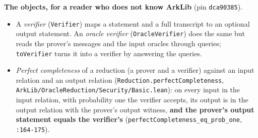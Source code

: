 \textbf{The objects, for a reader who does not know ArkLib} (pin \texttt{dca90385}).

\begin{itemize}
\item A \emph{verifier} (\texttt{Verifier}) maps a statement and a full transcript to an optional output statement. An \emph{oracle verifier} (\texttt{OracleVerifier}) does the same but reads the prover's messages and the input oracles through queries; \texttt{toVerifier} turns it into a verifier by answering the queries.
\item \emph{Perfect completeness} of a reduction (a prover and a verifier) against an input relation and an output relation (\texttt{R\allowbreak{}e\allowbreak{}d\allowbreak{}u\allowbreak{}c\allowbreak{}t\allowbreak{}i\allowbreak{}o\allowbreak{}n\allowbreak{}.\allowbreak{}p\allowbreak{}e\allowbreak{}r\allowbreak{}f\allowbreak{}e\allowbreak{}c\allowbreak{}t\allowbreak{}C\allowbreak{}o\allowbreak{}m\allowbreak{}p\allowbreak{}l\allowbreak{}e\allowbreak{}t\allowbreak{}e\allowbreak{}n\allowbreak{}e\allowbreak{}s\allowbreak{}s}, \texttt{A\allowbreak{}r\allowbreak{}k\allowbreak{}L\allowbreak{}i\allowbreak{}b\allowbreak{}/\allowbreak{}O\allowbreak{}r\allowbreak{}a\allowbreak{}c\allowbreak{}l\allowbreak{}e\allowbreak{}R\allowbreak{}e\allowbreak{}d\allowbreak{}u\allowbreak{}c\allowbreak{}t\allowbreak{}i\allowbreak{}o\allowbreak{}n\allowbreak{}/\allowbreak{}S\allowbreak{}e\allowbreak{}c\allowbreak{}u\allowbreak{}r\allowbreak{}i\allowbreak{}t\allowbreak{}y\allowbreak{}/\allowbreak{}B\allowbreak{}a\allowbreak{}s\allowbreak{}i\allowbreak{}c\allowbreak{}.\allowbreak{}l\allowbreak{}e\allowbreak{}a\allowbreak{}n}): on every input in the input relation, with probability one the verifier accepts, its output is in the output relation with the prover's output witness, \textbf{and the prover's output statement equals the verifier's} (\texttt{p\allowbreak{}e\allowbreak{}r\allowbreak{}f\allowbreak{}e\allowbreak{}c\allowbreak{}t\allowbreak{}C\allowbreak{}o\allowbreak{}m\allowbreak{}p\allowbreak{}l\allowbreak{}e\allowbreak{}t\allowbreak{}e\allowbreak{}n\allowbreak{}e\allowbreak{}s\allowbreak{}s\allowbreak{}\_\allowbreak{}e\allowbreak{}q\allowbreak{}\_\allowbreak{}p\allowbreak{}r\allowbreak{}o\allowbreak{}b\allowbreak{}\_\allowbreak{}o\allowbreak{}n\allowbreak{}e}, \texttt{:164-{}175}).

\end{itemize}
